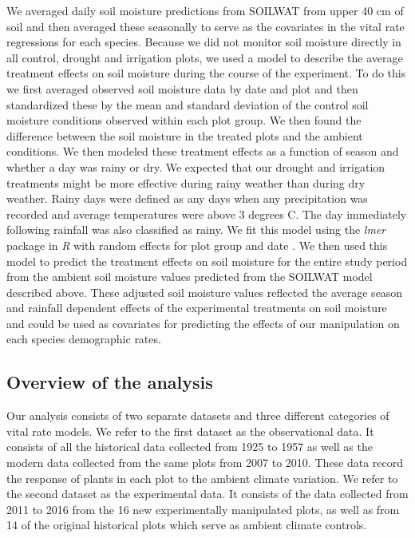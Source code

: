 \documentclass[11pt]{article}
\begin{document}
\begin{doublespacing}
We averaged daily soil moisture predictions from SOILWAT from upper 40 cm of soil and then averaged these seasonally to serve as the covariates in the vital rate regressions for each species. Because we did not monitor soil moisture directly in all control, drought and irrigation plots, we used a model to describe the average treatment effects on soil moisture during the course of the experiment. To do this we first averaged observed soil moisture data by date and plot and then standardized these by the mean and standard deviation of the control soil moisture conditions observed within each plot group. We then found the difference between the soil moisture in the treated plots and the ambient conditions. We then modeled these treatment effects as a function of season and whether a day was rainy or dry. We expected that our drought and irrigation treatments might be more effective during rainy weather than during dry weather. Rainy days were defined as any days when any precipitation was recorded and average temperatures were above 3 degrees C. The day immediately following rainfall was also classified as rainy. We fit this model using the \textit{lmer} package in \textit{R} with random effects for plot group and date \citep{bates_fitting_2015}. We then used this model to predict the treatment effects on soil moisture for the entire study period from the ambient soil moisture values predicted from the SOILWAT model described above. These adjusted soil moisture values reflected the average season and rainfall dependent effects of the experimental treatments on soil moisture and could be used as covariates for predicting the effects of our manipulation on each species demographic rates. 


\subsection*{Overview of the analysis}

Our analysis consists of two separate datasets and three different categories of vital rate models. We refer to the first dataset as the observational data. It consists of all the historical data collected from 1925 to 1957 as well as the modern data collected from the same plots from 2007 to 2010. These data record the response of plants in each plot to the ambient climate variation. We refer to the second dataset as the experimental data.  It consists of the data collected from 2011 to 2016 from the 16 new experimentally manipulated plots, as well as from 14 of the original historical plots which serve as ambient climate controls.  


\end{doublespacing}
\end{document}
